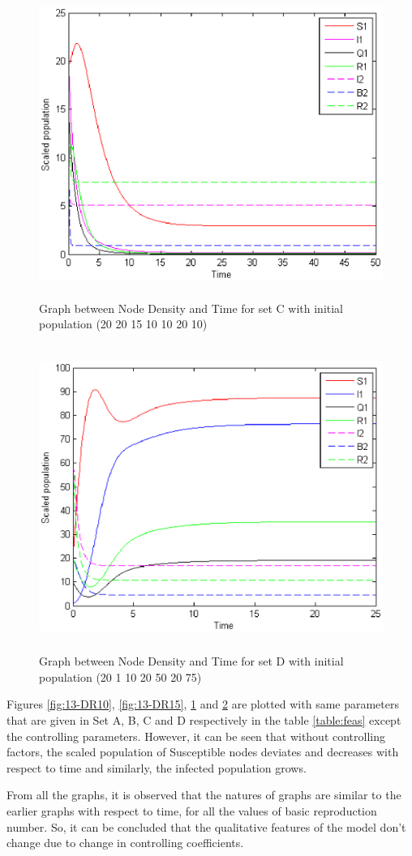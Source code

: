 \begin{figure}
\centerline{\includegraphics[width=15cm,height=10cm]{13-DR16}}
\caption{Graph between Node Density and Time for set C with initial population (20 20 15 10 10 20 10)}
\label{fig:13-DR16}
\end{figure}
\begin{figure}
\centerline{\includegraphics[width=15cm,height=10cm]{13-DR7}}
\caption{Graph between Node Density and Time for set D with initial population (20 1 10 20 50 20 75)}
\label{fig:13-DR7}
\end{figure}
\par Figures  \ref{fig:13-DR10},  \ref{fig:13-DR15},  \ref{fig:13-DR16} and
\ref{fig:13-DR7} are plotted with same parameters that are given in Set A, B, C
and D respectively in the table \ref{table:feas} except the controlling parameters. However, it can be seen
that without controlling factors, the scaled population of Susceptible nodes
 deviates and decreases with respect to time and similarly, the infected population grows.
\par From  all the graphs, it is observed that the natures of graphs are
similar to the earlier graphs with respect to time, for all the values of
basic reproduction number. So, it can
 be concluded that the qualitative features of the model don't change
 due to change in controlling coefficients.
\clearpage
